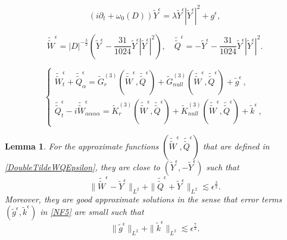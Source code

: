 \documentclass[10pt,a4paper]{amsart}
\newtheorem{lemma}{Lemma}
\newcommand{\al}{\alpha}
\newcommand{\f}{\frac}
\begin{document}
\begin{equation} \label{TildeYEpsilon}
(i \partial_t + \omega_0(D)) \tilde{Y}^\epsilon = \lambda \tilde{Y}^\epsilon |\tilde{Y}^\epsilon|^2 + g^\epsilon,    
\end{equation}

\begin{equation} \label{DoubleTildeWQEpsilon}
 \tilde{\tilde{W}}^\epsilon = |D|^{-\f32}\left(\tilde{Y}^\epsilon -\frac{31}{1024} \tilde{Y}^\epsilon |\tilde{Y}^\epsilon|^2\right), \quad \tilde{\tilde{Q}}^\epsilon = -\tilde{Y}^\epsilon-\frac{31}{1024} \tilde{Y}^\epsilon |\tilde{Y}^\epsilon|^2.
\end{equation}

 \begin{equation}\label{NF5}
\begin{cases}		\tilde{\tilde{W}}^\epsilon_t+\tilde{\tilde{Q}}^\epsilon_{\al}=\tilde{G}_r^{(3)}(\tilde{\tilde{W}}^\epsilon, \tilde{\tilde{Q}}^\epsilon)+\tilde{G}_{null}^{(3)}(\tilde{\tilde{W}}^\epsilon, \tilde{\tilde{Q}}^\epsilon)+ \tilde{g}^{\epsilon}\,,\\
\tilde{\tilde{Q}}^\epsilon_t-i\tilde{\tilde{W}}^\epsilon_{\al\al\al\al}= \tilde{K}_r^{(3)}(\tilde{\tilde{W}}^\epsilon, \tilde{\tilde{Q}}^\epsilon)+  \tilde{K}_{null}^{(3)}(\tilde{\tilde{W}}^\epsilon, \tilde{\tilde{Q}}^\epsilon)+ \tilde{k}^{\epsilon}\,,
\end{cases}
\end{equation}

\begin{lemma}
For the approximate functions $(\tilde{\tilde{W}}^\epsilon, \tilde{\tilde{Q}}^\epsilon)$ that are defined in \eqref{DoubleTildeWQEpsilon}, they are close to $(\tilde{Y}^\epsilon, - \tilde{Y}^\epsilon)$ such that
\begin{equation} \label{DoulbleTildeWQYdiff}
 \|\tilde{\tilde{W}}^\epsilon - \tilde{Y}^\epsilon\|_{L^2} + \|\tilde{\tilde{Q}}^\epsilon + \tilde{Y}^\epsilon\|_{L^2} \lesssim \epsilon^\f32.
\end{equation}
Moreover, they are good approximate solutions in the sense that error terms $(\tilde{g}^\epsilon, \tilde{k}^\epsilon)$ in \eqref{NF5} are small such that
\begin{equation} \label{TildegkEst}
 \|\tilde{g}^\epsilon\|_{L^2} + \|\tilde{k}^\epsilon\|_{L^2} \lesssim \epsilon^{\f72}. 
\end{equation}
\end{lemma}
\end{document}
